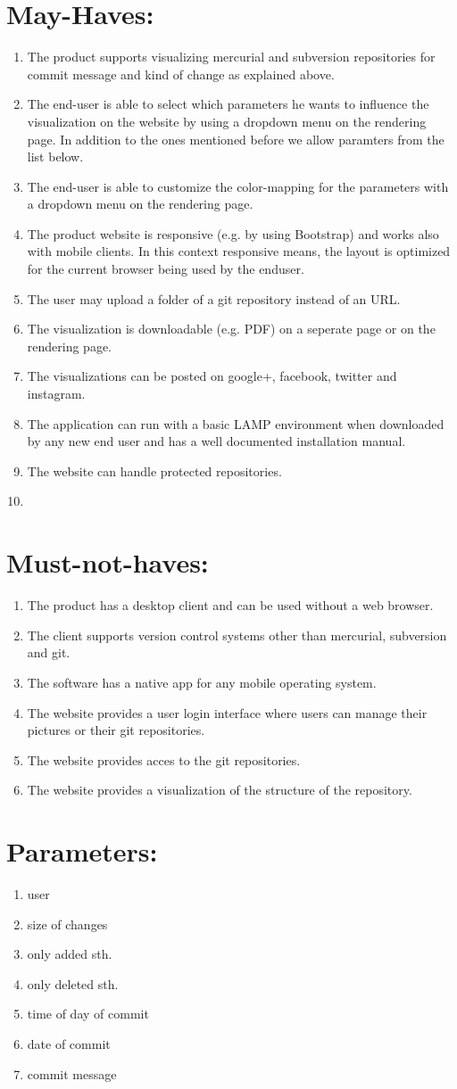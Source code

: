 \documentclass[10pt]{scrartcl}
\begin{document}
\section{May-Haves:}
\begin{enumerate}
\item The product supports visualizing mercurial and subversion repositories for commit message and kind of change as explained above.
\item The end-user is able to select which parameters he wants to influence the visualization on the website by using a dropdown menu on the rendering page. In addition to the ones mentioned before we allow paramters from the list below.
\item The end-user is able to customize the color-mapping for the parameters with  a dropdown menu on the rendering page.
\item The product website is responsive (e.g. by using Bootstrap) and works also with mobile clients. In this context responsive means, the layout is optimized for the current browser being used by the enduser.
\item The user may upload a folder of a git repository instead of an URL.
\item The visualization is downloadable (e.g. PDF) on a seperate page or on the rendering page.
\item The visualizations can be posted on google+, facebook, twitter and instagram.
\item The application can run with a basic LAMP environment when downloaded by any new end user and has a well documented installation manual.
\item The website can handle protected repositories.
\item 
\end{enumerate}
\section{Must-not-haves:}
\begin{enumerate}
\item The product has a desktop client and can be used without a web browser.
\item The client supports version control systems other than mercurial, subversion and git.
\item The software has a native app for any mobile operating system.
\item The website provides a user login interface where users can manage their pictures or their git repositories.
\item The website provides acces to the git repositories.
\item The website provides a visualization of the structure of the repository.
\end{enumerate}
\section{Parameters:}
\begin{enumerate}
\item user
\item size of changes
\item only added sth.
\item only deleted sth.
\item time of day of commit
\item date of commit
\item commit message
\end{enumerate}
\end{document}
